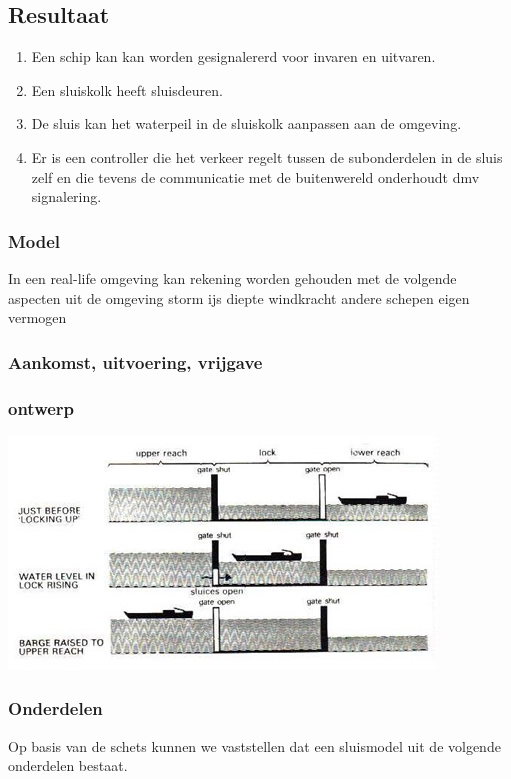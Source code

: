 \subsection{Resultaat}

\begin{enumerate}
	\item Een schip kan kan worden gesignalererd voor invaren en uitvaren. 
	\item Een sluiskolk heeft sluisdeuren.  
	\item De sluis kan het waterpeil in de sluiskolk aanpassen aan de omgeving. 
	\item Er is een controller die het verkeer regelt tussen de subonderdelen in de sluis zelf en die tevens de communicatie met de buitenwereld onderhoudt dmv signalering.
\end{enumerate}




\subsubsection{Model}

In een real-life omgeving kan rekening worden gehouden met de volgende aspecten uit de omgeving
storm
ijs
diepte
windkracht
andere schepen
eigen vermogen

\subsubsection{Aankomst, uitvoering, vrijgave}


\subsubsection{ontwerp}

\includegraphics[scale=0.65]{sluismodel.jpg}

\subsubsection{Onderdelen}
Op basis van de schets kunnen we vaststellen dat een sluismodel uit de volgende onderdelen bestaat.

